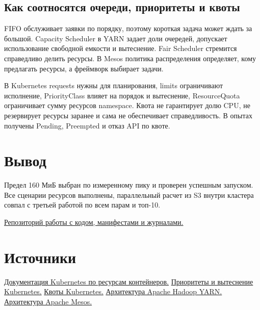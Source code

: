 \subsection{Как соотносятся очереди, приоритеты и квоты}

FIFO обслуживает заявки по порядку, поэтому короткая задача может ждать
за большой. Capacity Scheduler в YARN задает доли очередей, допускает
использование свободной емкости и вытеснение. Fair Scheduler стремится
справедливо делить ресурсы. В Mesos политика распределения определяет,
кому предлагать ресурсы, а фреймворк выбирает задачи.

В Kubernetes requests нужны для планирования, limits ограничивают
исполнение, PriorityClass влияет на порядок и вытеснение, ResourceQuota
ограничивает сумму ресурсов namespace. Квота не гарантирует долю CPU,
не резервирует ресурсы заранее и сама не обеспечивает справедливость.
В опытах получены Pending, Preempted и отказ API по квоте.

\section{Вывод}

Предел 160 МиБ выбран по измеренному пику и проверен успешным запуском.
Все сценарии ресурсов выполнены, параллельный расчет из S3 внутри кластера
совпал с третьей работой по всем парам и топ-10.

\href{https://github.com/Gegerout/data-engineering-lab5}{Репозиторий работы с кодом, манифестами и журналами.}

\section{Источники}

\href{https://kubernetes.io/docs/concepts/configuration/manage-resources-containers/}{Документация Kubernetes по ресурсам контейнеров.}
\href{https://kubernetes.io/docs/concepts/scheduling-eviction/pod-priority-preemption/}{Приоритеты и вытеснение Kubernetes.}
\href{https://kubernetes.io/docs/concepts/policy/resource-quotas/}{Квоты Kubernetes.}
\href{https://hadoop.apache.org/docs/stable/hadoop-yarn/hadoop-yarn-site/YARN.html}{Архитектура Apache Hadoop YARN.}
\href{https://mesos.apache.org/documentation/latest/architecture/}{Архитектура Apache Mesos.}
